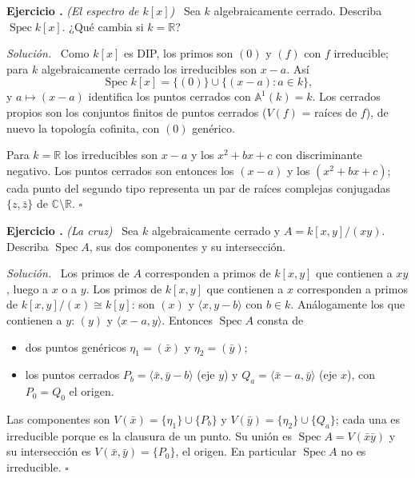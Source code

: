 \documentclass[11pt,a4paper]{article}
\newcommand{\Spec}{\operatorname{Spec}}
\newcommand{\RR}{\mathbb{R}}
\newcommand{\CC}{\mathbb{C}}
\newcommand{\A}{\mathbb{A}}
\newcommand{\gen}[1]{\langle #1\rangle}
\newcounter{ej}
\newenvironment{ejercicio}[1]{\refstepcounter{ej}\par\bigskip\noindent\textbf{Ejercicio \theej.} \emph{(#1)}\ }{\par}
\newenvironment{solucion}{\par\smallskip\noindent\textit{Solución.}\ }{\hfill$\square$\par}
\begin{document}
\begin{ejercicio}{El espectro de $k[x]$}
Sea $k$ algebraicamente cerrado. Describa $\Spec k[x]$. ¿Qué cambia si $k=\RR$?
\end{ejercicio}
\begin{solucion}
Como $k[x]$ es DIP, los primos son $(0)$ y $(f)$ con $f$ irreducible; para $k$ algebraicamente cerrado los irreducibles son $x-a$. Así
$$\Spec k[x]=\{(0)\}\cup\{(x-a):a\in k\},$$
y $a\mapsto(x-a)$ identifica los puntos cerrados con $\A^1(k)=k$. Los cerrados propios son los conjuntos finitos de puntos cerrados ($V(f)$ = raíces de $f$), de nuevo la topología cofinita, con $(0)$ genérico.

Para $k=\RR$ los irreducibles son $x-a$ y los $x^2+bx+c$ con discriminante negativo. Los puntos cerrados son entonces los $(x-a)$ y los $(x^2+bx+c)$; cada punto del segundo tipo representa un par de raíces complejas conjugadas $\{z,\bar z\}$ de $\CC\setminus\RR$.
\end{solucion}

\begin{ejercicio}{La cruz}
Sea $k$ algebraicamente cerrado y $A=k[x,y]/(xy)$. Describa $\Spec A$, sus dos componentes y su intersección.
\end{ejercicio}
\begin{solucion}
Los primos de $A$ corresponden a primos de $k[x,y]$ que contienen a $xy$, luego a $x$ o a $y$. Los primos de $k[x,y]$ que contienen a $x$ corresponden a primos de $k[x,y]/(x)\cong k[y]$: son $(x)$ y $\gen{x,y-b}$ con $b\in k$. Análogamente los que contienen a $y$: $(y)$ y $\gen{x-a,y}$. Entonces $\Spec A$ consta de
\begin{itemize}[itemsep=1pt]
\item dos puntos genéricos $\eta_1=(\bar x)$ y $\eta_2=(\bar y)$;
\item los puntos cerrados $P_b=\gen{\bar x,\bar y-b}$ (eje $y$) y $Q_a=\gen{\bar x-a,\bar y}$ (eje $x$), con $P_0=Q_0$ el origen.
\end{itemize}
Las componentes son $V(\bar x)=\{\eta_1\}\cup\{P_b\}$ y $V(\bar y)=\{\eta_2\}\cup\{Q_a\}$; cada una es irreducible porque es la clausura de un punto. Su unión es $\Spec A=V(\bar x\bar y)$ y su intersección es $V(\bar x,\bar y)=\{P_0\}$, el origen. En particular $\Spec A$ no es irreducible.
\end{solucion}
\end{document}
